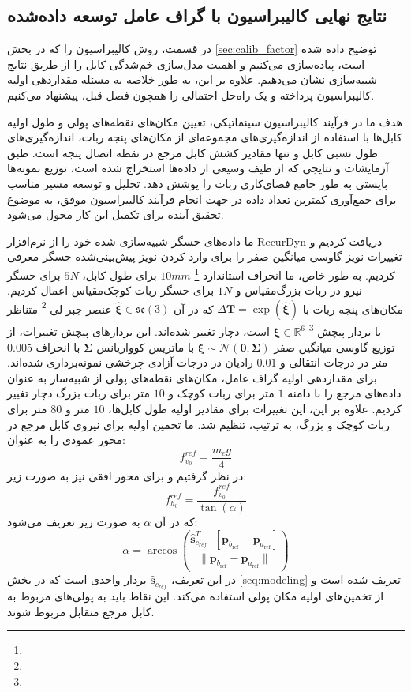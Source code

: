 \subsection{نتایج نهایی کالیبراسیون با گراف عامل توسعه‌ داده‌شده}
در قسمت، روش کالیبراسیون را که در بخش 
\ref{sec:calib_factor}
توضیح داده شده است، پیاده‌سازی می‌کنیم و اهمیت مدل‌سازی خم‌شدگی کابل را از طریق نتایج شبیه‌سازی نشان می‌دهیم. علاوه بر این، به طور خلاصه به مسئله مقداردهی اولیه کالیبراسیون پرداخته و یک راه‌حل احتمالی را همچون فصل قبل، پیشنهاد می‌کنیم.

هدف ما در فرآیند کالیبراسیون سینماتیکی، تعیین مکان‌های نقطه‌های پولی و طول اولیه کابل‌ها با استفاده از اندازه‌گیری‌های مجموعه‌ای از مکان‌های پنجه ربات، اندازه‌گیری‌های طول نسبی کابل و تنها مقادیر کشش کابل مرجع در نقطه اتصال پنجه است. طبق آزمایشات و نتایجی که از طیف وسیعی از داده‌ها استخراج شده است، توزیع نمونه‌ها بایستی به طور جامع فضای‌کاری ربات را پوشش دهد. تحلیل و توسعه مسیر مناسب برای جمع‌آوری کمترین تعداد داده در جهت انجام فرآیند کالیبراسیون موفق، به موضوع تحقیق آینده برای تکمیل این کار محول می‌شود.

ما داده‌های حسگر شبیه‌سازی شده خود را از نرم‌افزار RecurDyn دریافت کردیم و تغییرات نویز گاوسی میانگین صفر را برای وارد کردن نویز پیش‌بینی‌شده حسگر معرفی کردیم. به طور خاص، ما انحراف استاندارد
\footnote{} 
$10mm$ 
برای طول کابل، $5N$ برای حسگر نیرو در ربات بزرگ‌مقیاس و $1N$ برای حسگر ربات کوچک‌مقیاس اعمال کردیم. مکان‌های پنجه ربات با $\Delta \mathbf{T} = \exp(\hat{\boldsymbol{\xi}})$ که در آن $\hat{\boldsymbol{\xi}} \in \mathfrak{se}(3)$ عنصر جبر لی
\footnote{}
 متناظر با بردار پیچش
\footnote{}
  $\boldsymbol{\xi} \in \mathbb{R}^6$
 است، دچار تغییر شده‌اند. این بردارهای پیچش تغییرات، از توزیع گاوسی میانگین صفر $\boldsymbol{\xi}\sim\mathcal{N}(\mathbf{0}, \boldsymbol{\Sigma})$ با ماتریس کوواریانس $\boldsymbol{\Sigma}$ با انحراف $0.005$ متر در درجات انتقالی و $0.01$ رادیان در درجات آزادی چرخشی نمونه‌برداری شده‌اند.
برای مقداردهی اولیه گراف عامل، مکان‌های نقطه‌های پولی از شبیه‌ساز به عنوان داده‌های مرجع را با دامنه $1$ متر برای ربات کوچک و $10$ متر برای  ربات بزرگ دچار تغییر کردیم. علاوه بر این، این تغییرات برای مقادیر اولیه طول کابل‌ها، $10$ متر و $80$ متر برای ربات کوچک و بزرگ، به ترتیب، تنظیم شد. ما تخمین اولیه برای نیروی کابل مرجع در محور عمودی را به عنوان:
\begin{equation}  \label{eq:fv_0}
	f^{{ref}}_{v_0} = \frac{m_eg}{4}
\end{equation}
  در نظر گرفتیم و برای محور افقی نیز به صورت زیر:
\begin{equation}  \label{eq:fh_0}
	f^{ref}_{h_0}=\frac{f^{{ref}}_{v_0}}{\tan(\alpha)} 
\end{equation}
که در آن $\alpha$ به صورت زیر تعریف می‌شود:
\begin{equation}  \label{eq:alpha}
	\alpha = \arccos\left(\frac{\hat{\bm{s}}_{c_{ref}}^T \cdot [\bm{p}_{b_{\text{ref}}} - \bm{p}_{a_{\text{ref}}}]}{\| \bm{p}_{b_{\text{ref}}} - \bm{p}_{a_{\text{ref}}} \|}\right)
\end{equation}
در این تعریف، $\hat{\bm{s}}_{c_{ref}}$ بردار واحدی است که در بخش \ref{seq:modeling} تعریف شده است و از تخمین‌های اولیه مکان پولی استفاده می‌کند. این نقاط باید به پولی‌های مربوط به کابل مرجع متقابل مربوط ‌شوند.

